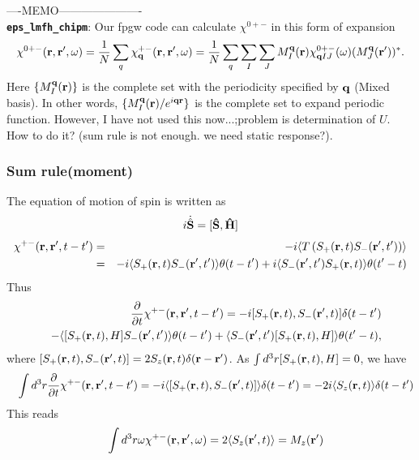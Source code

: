\documentclass[a4paper,10pt,epsf,fleqn]{article}
\newcommand{\bfq}{{\bf q}}
\newcommand{\bfr}{{\bf r}}
\begin{document}
\noindent ----MEMO----------------------\\
{\bf \tt eps\_lmfh\_chipm}: Our fpgw code can calculate
$\chi^{0+-}$ in this form of expansion
\begin{eqnarray}
\chi^{0+-}(\bfr,\bfr',\omega) 
= \frac{1}{N}\sum_q \chi^{+-}_\bfq(\bfr,\bfr',\omega)
= \frac{1}{N}\sum_q \sum_I \sum_J
M^\bfq_I(\bfr) \chi^{0+-}_{\bfq IJ}(\omega) (M^\bfq_J(\bfr'))^*.
\label{chiexpand}
\end{eqnarray}
Here $\{ M^\bfq_I(\bfr) \}$ is the complete set with the periodicity specified 
by $\bfq$ (Mixed basis).
In other words, $\{ M^\bfq_I(\bfr) /e^{i \bfq \bfr} \}$ 
is the complete set to expand periodic function.
However, I have not used this now...;problem is determination of $U$. How to do it?
(sum rule is not enough. we need static response?).


\subsubsection{Sum rule(moment)} 
The equation of motion of spin is written as
\begin{eqnarray}
i \dot{\hat{\bf S}} = [\hat{\bf S},  \hat{H}]
\end{eqnarray}
\begin{eqnarray}
\chi^{+-}(\bfr,\bfr',t-t') 
&=& -i\langle T\left( S_+(\bfr,t) S_-(\bfr',t') \right) \rangle                \nonumber\\
&=& -i\langle S_+(\bfr,t)   S_-(\bfr',t') \rangle \theta(t-t')
+ i\langle S_-(\bfr',t') S_+(\bfr,t)   \rangle \theta(t'-t)
\end{eqnarray}
Thus
\begin{eqnarray}
&&\frac{\partial }{\partial t} \chi^{+-}(\bfr,\bfr',t-t') 
= -i [S_+(\bfr,t),   S_-(\bfr',t)] \delta(t-t') \nonumber\\
&&-  \langle [S_+(\bfr,t),H]   S_-(\bfr',t') \rangle \theta(t-t') 
+  \langle S_-(\bfr',t')   [S_+(\bfr,t),H] \rangle \theta(t'-t),
\end{eqnarray}
where $[S_+(\bfr,t), S_-(\bfr',t)]= 2S_z(\bfr,t) \delta(\bfr-\bfr')$.
As $\int d^3r [S_+(\bfr,t),H]=0$, we have
\begin{eqnarray}
&&\int d^3r \frac{\partial }{\partial t} \chi^{+-}(\bfr,\bfr',t-t') 
= -i \langle [S_+(\bfr,t),   S_-(\bfr',t)] \rangle \delta(t-t') 
= -2 i \langle S_z(\bfr,t) \rangle \delta(t-t') 
\end{eqnarray}
This reads
\begin{eqnarray}
&&\int d^3r \omega \chi^{+-}(\bfr,\bfr',\omega) 
= 2 \langle S_z(\bfr',t) \rangle = M_z(\bfr') 
\end{eqnarray}
\end{document}
